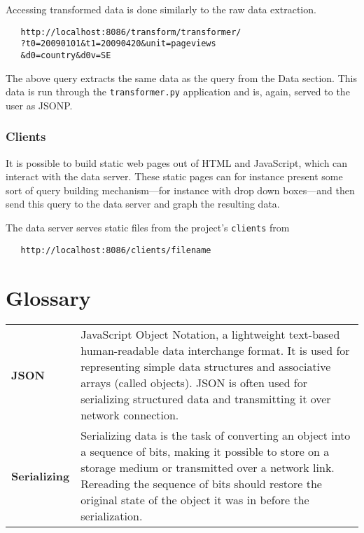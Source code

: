 Accessing transformed data is done similarly to the raw data extraction.

\begin{verbatim}
   http://localhost:8086/transform/transformer/
   ?t0=20090101&t1=20090420&unit=pageviews
   &d0=country&d0v=SE
\end{verbatim}

\noindent The above query extracts the same data as the query from the Data
section. This data is run through the \texttt{transformer.py} application and
is, again, served to the user as JSONP.


\subsection*{Clients}

It is possible to build static web pages out of HTML and JavaScript, which
can interact with the data server. These static pages can for instance
present some sort of query building mechanism---for instance with drop down
boxes---and then send this query to the data server and graph the resulting
data.

The data server serves static files from the project's \texttt{clients} from

\begin{verbatim}
   http://localhost:8086/clients/filename
\end{verbatim}



\chapter{Glossary}

\begin{tabular}[t]{lp{100mm}}
\textbf{JSON} &
JavaScript Object Notation, a lightweight text-based human-readable data
interchange format. It is used for representing simple data structures and
associative arrays (called objects). JSON is often used for serializing
structured data and transmitting it over network connection.

 \\

\textbf{Serializing} &
Serializing data is the task of converting an object into a sequence of bits,
making it possible to store on a storage medium or transmitted over a network
link. Rereading the sequence of bits should restore the original state of the
object it was in before the serialization. \\
\end{tabular}



